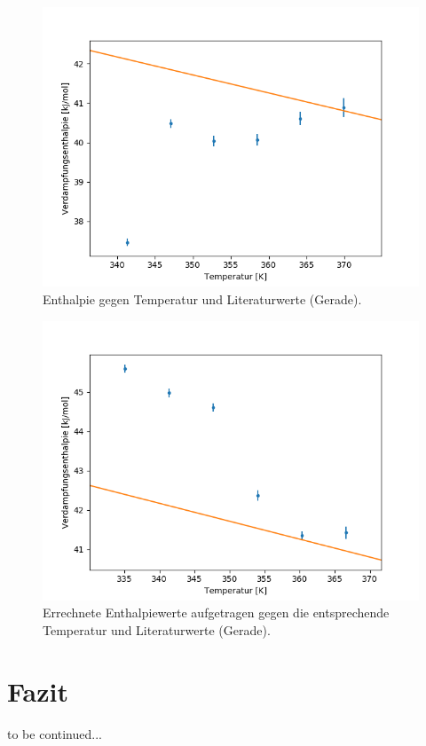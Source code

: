 \documentclass[12pt,a4paper]{article}
\begin{document}
\begin{figure}
\begin{center}
\includegraphics[scale=0.9]{Bilder/Enthalpie_gegen_TempA}
\caption{Enthalpie gegen Temperatur und Literaturwerte (Gerade).}
\label{fig:EntTempA}
\end{center}
\end{figure}

\begin{figure}[H]
\begin{center}
\includegraphics[scale=0.8]{Bilder/Enthalpie_gegen_TempB}
\caption[Enthalpie - Temperatur]{Errechnete Enthalpiewerte aufgetragen gegen die entsprechende Temperatur und Literaturwerte (Gerade).}
\label{fig:EntTempB}
\end{center}
\end{figure}






\section{Fazit}
to be continued...
\end{document}
